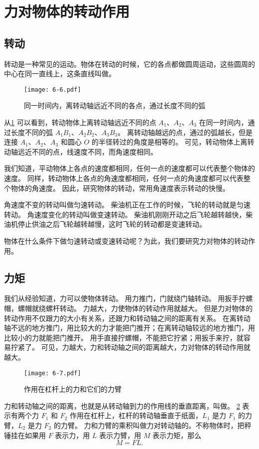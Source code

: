 \section{力对物体的转动作用}
\subsection{转动}
转动是一种常见的运动。物体在转动的时候，它的各点都做圆周运动，这些圆周的中心在同一直线上，这条直线叫做。
\begin{figure}
  \texttt{[image: 6-6.pdf]}
  \caption{同一时间内，离转动轴远近不同的各点，通过长度不同的弧}\label{fig:6-6}
\end{figure}

从\cref{fig:6-6} 可以看到，转动物体上离转动轴远近不同的点 $A_1$、$A_2$、$A_3$ 在同一时间内，通过长度不同的弧 $A_1B_1$、$A_2B_2$、$A_3B_3$。
离转动轴越远的点，通过的弧越长，但是连接 $A_1$、$A_2$、$A_3$ 和圆心 $O$ 的半径转过的角度是相等的。
可见，转动物体上离转动轴远近不同的点，线速度不同，而角速度相同。

我们知道，平动物体上各点的速度都相同，任何一点的速度都可以代表整个物体的速度。
同样，转动物体上各点的角速度都相同，任何一点的角速度都可以代表整个物体的角速度。
因此，研究物体的转动，常用角速度表示转动的快慢。

角速度不变的转动叫做匀速转动。
柴油机正在工作的时候，飞轮的转动就是匀速转动。
角速度变化的转动叫做变速转动。
柴油机刚刚开动之后飞轮越转越快，柴油机停止供油之后飞轮越转越慢，这时飞轮的转动都是变速转动。

物体在什么条件下做匀速转动或变速转动呢？为此，我们要研究力对物体的转动作用。

\subsection{力矩} 
我们从经验知道，力可以使物体转动。
用力推门，门就绕门轴转动。
用扳手拧螺帽，螺帽就绕螺杆转动。
力越大，力使物体的转动作用就越大。
但是力对物体的转动作用不仅跟力的大小有关系，还跟力和转动轴之间的距离有关系。
在离转动轴不远的地方推门，用比较大的力才能把门推开；在离转动轴较远的地方推门，用比较小的力就能把门推开。
用手直接拧螺帽，不能把它拧紧；用扳手来拧，就容易拧紧了。
可见，力越大，力和转动轴之间的距离越大，力对物体的转动作用就越大。
\begin{figure}
	\texttt{[image: 6-7.pdf]}
	\caption{作用在杠杆上的力和它们的力臂}\label{fig:6-7}
\end{figure}

力和转动轴之间的距离，也就是从转动轴到力的作用线的垂直距离，叫做。
\cref{fig:6-7} 表示有两个力 $F_1$ 和 $F_2$ 作用在杠杆上，杠杆的转动轴垂直于纸面，$L_1$ 是力 $F_1$ 的力臂，$L_2$ 是力 $F_2$ 的力臂。
力和力臂的乘积叫做力对转动轴的。不称物体时，把秤锤挂在如果用 $F$ 表示力，用 $L$ 表示力臂，用 $M$ 表示力矩，那么
\[M=FL.\]

